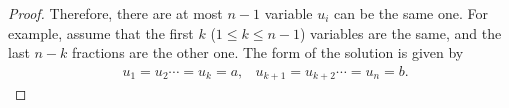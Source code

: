 \begin{proof}
Therefore, there  are  at  most  $n-1$ 
variable  
$u_{i}$ 
can be the  same  one. 
For  example, 
assume  that  the  first  $k$ ($ 1 \le  k  \le  n-1 $)  
variables  are the  same, 
and 
the last   $n-k$ fractions  are the other one. 
The  form of the  solution  is  given by 
\begin{align}\label{ab_struc}
& u_{1}=u_{2} \cdots=u_{k}  =a  ,  
&u_{k+1}=u_{k+2}  \cdots=u_{n} =b.  
\end{align}






\end{proof}
